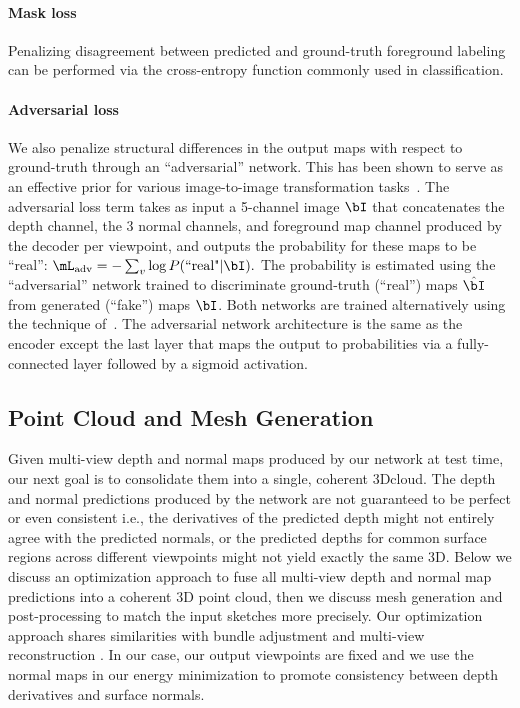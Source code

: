 \documentclass[10pt, conference, compsocconf]{IEEEtran}
\begin{document}
\vspace{-1mm}\paragraph{Mask loss} Penalizing disagreement between predicted and ground-truth foreground labeling can be performed via the cross-entropy function commonly used in classification.

\vspace{-1mm}\paragraph{Adversarial loss} We also penalize structural differences in the output maps with respect to ground-truth through an ``adversarial'' network. This has been shown to serve as an effective prior for various image-to-image transformation tasks~\cite{pix2pix2016}. The adversarial loss term takes as input a 5-channel image $\bI$ that concatenates the depth channel, the 3 normal channels, and foreground map channel produced by the decoder per viewpoint, and outputs the probability for these maps to be ``real'': $\mL_{\text{adv}} = - \sum_v \log P(\text{``real"}|\bI).$
The probability is estimated using the ``adversarial'' network trained to discriminate ground-truth (``real'') maps $\hat{\bI}$ from generated (``fake'') maps  $\bI$. Both networks are trained alternatively using the technique of~\cite{Goodfellow:2014:GAN}. The adversarial network architecture is the same as the encoder except the last layer that maps the output to probabilities via a fully-connected layer followed by a sigmoid activation.


\vspace{-2mm}
\subsection{Point Cloud and Mesh Generation}
\label{sec:meshing}
\label{sec:post_processing}\vspace{-2mm}
Given multi-view depth and normal maps produced by our network at test time, our next goal is to consolidate them into a single, coherent 3D\point cloud. The depth and normal predictions produced by the network are not guaranteed to be  perfect or even consistent i.e., the derivatives of the predicted depth might not entirely agree with the predicted normals, or the predicted depths for common surface regions  across different viewpoints might not yield exactly the same 3D\points. Below we discuss an optimization approach to fuse all multi-view depth and normal map predictions into a coherent 3D point cloud, then we discuss mesh generation and post-processing to match the input sketches more precisely. Our optimization approach shares similarities with bundle adjustment and multi-view reconstruction \cite{Triggs:1999:BAM,MVSreconstruction}. In our case, our output viewpoints are fixed and we use the normal maps in our energy minimization to promote consistency between depth derivatives and surface normals.   
\end{document}
